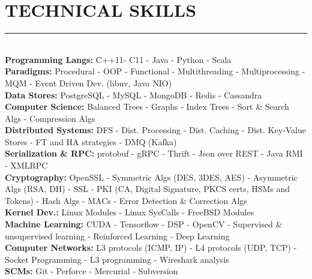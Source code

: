 \documentclass[10pt,a4paper]{article}
\begin{document}
\section{TECHNICAL SKILLS}
\noindent \rule {4.8cm}{0.4pt} \\
\noindent
\textbullet \hspace{0.1cm}\textbf{Programming Langs:} C++11- C11 - Java - Python - Scala \\
\textbullet \hspace{0.1cm}\textbf{Paradigms:} Procedural - OOP - Functional - Multithreading - Multiprocessing - MQM - Event Driven Dev. (libuv, Java NIO) \\
\textbullet \hspace{0.1cm}\textbf{Data Stores:} PostgreSQL - MySQL - MongoDB - Redis - Cassandra \\
\textbullet \hspace{0.1cm}\textbf{Computer Science:} Balanced Trees - Graphs - Index Trees - Sort \& Search Algs - Compression Algs  \\
\textbullet \hspace{0.1cm}\textbf{Distributed Systems:} DFS - Dist. Processing - Dist. Caching - Dist. Key-Value Stores - FT and HA strategies - DMQ (Kafka) \\
\textbullet \hspace{0.1cm}\textbf{Serialization \& RPC:} protobuf - gRPC - Thrift - Json over REST - Java RMI - XMLRPC \\
\textbullet \hspace{0.1cm}\textbf{Cryptography:} OpenSSL - Symmetric Algs (DES, 3DES, AES) - Asymmetric Algs (RSA, DH) - SSL - PKI (CA, Digital Signature, PKCS certs, HSMs and Tokens) - Hash Algs - MACs - Error Detection \& Correction Algs \\ 
\textbullet \hspace{0.1cm}\textbf{Kernel Dev.:} Linux Modules - Linux SysCalls - FreeBSD Modules \\
\textbullet \hspace{0.1cm}\textbf{Machine Learning:} CUDA - Tensorflow - DSP - OpenCV - Supervised \& unsupervised learning - Reinforced Learning - Deep Learning \\
\textbullet \hspace{0.1cm}\textbf{Computer Networks:} L3 protocols (ICMP, IP) - L4 protocols (UDP, TCP) - Socket Programming - L3 programming - Wireshark analysis \\
\textbullet \hspace{0.1cm}\textbf{SCMs:} Git - Perforce - Mercurial - Subversion \\
\end{document}

